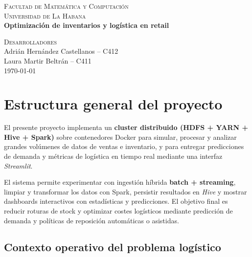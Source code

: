 \documentclass[12pt,a4paper]{article}
\begin{document}
	\begin{titlepage}
		\centering
		\vspace*{1cm}
		
		{\Large\scshape Facultad de Matemática y Computación}\\[6pt]
		{\large\textsc{Universidad de La Habana}}\\[2.2cm]
		
		{\huge\bfseries \textcolor{uhblue}{Optimización de inventarios y logística en retail}}\\[1.6cm]
		
		\vfill
		
		{\large\scshape Desarrolladores}\\[8pt]
		{\large Adrián Hernández Castellanos \quad -- \quad C412}\\[6pt]
		{\large Laura Martir Beltrán \quad -- \quad C411}\\[2.2cm]
		
		\vfill
		{\large \today}
		
		\vspace*{0.8cm}
	\end{titlepage}
	
	\tableofcontents
	\thispagestyle{empty}
	\newpage
	
	\section*{Estructura general del proyecto}
	El presente proyecto implementa un \textbf{cluster distribuido (HDFS + YARN + Hive + Spark)} sobre contenedores Docker para simular, procesar y analizar grandes volúmenes de datos de ventas e inventario, y para entregar predicciones de demanda y métricas de logística en tiempo real mediante una interfaz \textit{Streamlit}. 
	
	El sistema permite experimentar con ingestión híbrida \textbf{batch + streaming}, limpiar y transformar los datos con Spark, persistir resultados en \textit{Hive} y mostrar dashboards interactivos con estadísticas y predicciones. El objetivo final es reducir roturas de stock y optimizar costes logísticos mediante predicción de demanda y políticas de reposición automáticas o asistidas.
	
	\subsection*{Contexto operativo del problema logístico}
	
\end{document}
